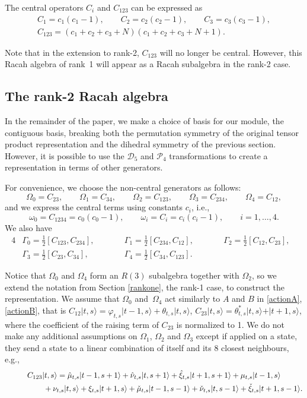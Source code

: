 \documentclass[10pt,a4paper]{amsart}
\numberwithin{equation}{section}
\begin{document}
The central operators $C_i$ and $C_{123}$ can be expressed as
\begin{gather*}
  C_1=c_1(c_1-1),\qquad C_2=c_2(c_2-1),\qquad C_3=c_3(c_3-1),\\
  C_{123}=(c_1+c_2+c_3+N)(c_1+c_2+c_3+N+1).
\end{gather*}


Note that in the extension to rank-2, $C_{123}$ will no longer be central. However, this Racah algebra of rank~1 will appear as a Racah subalgebra in the rank-2 case.

\subsection{The rank-2 Racah algebra}

In the remainder of the paper, we make a choice of basis for our module, the contiguous basis, breaking both the permutation symmetry of the original tensor product representation and the dihedral symmetry of the previous section. However, it is possible to use the $\mathcal{D}_5$ and $\mathcal{P}_4$ transformations to create a representation in terms of other generators.

For convenience, we choose the non-central generators as follows:
\[ \Omega_0 = C_{23}, \qquad \Omega_1=C_{34}, \qquad \Omega_2=C_{123}, \qquad \Omega_3=C_{234}, \qquad \Omega_4=C_{12},\]
and we express the central terms using constants $c_i$, i.e.,
\[
\omega_0=C_{1234}=c_0(c_0-1),\qquad \omega_i=C_i=c_i(c_i-1),\qquad i=1,\dots,4.
\]
We also have
\begin{alignat*}{4}
   &\Gamma_0=\tfrac{1}{2}[C_{123},C_{234}],\qquad && \Gamma_1=\tfrac{1}{2}[C_{234},C_{12}],\qquad &&\Gamma_2=\tfrac{1}{2}[C_{12},C_{23}],&\\
  & \Gamma_3=\tfrac{1}{2}[C_{23},C_{34}],\qquad &&\Gamma_4=\tfrac{1}{2}[C_{34},C_{123}].&&&
\end{alignat*}

Notice that $\Omega_0$ and $\Omega_4$ form an $R(3)$ subalgebra together with $\Omega_2$, so we extend the notation from Section \ref{rankone}, the rank-1 case, to construct the representation. We assume that $\Omega_0$ and~$\Omega_4$ act similarly to $A$ and $B$ in \eqref{actionA}, \eqref{actionB}, that is
$
C_{12}\vert t,s\rangle=\varphi_{t,s}\vert t-1,s\rangle+\theta_{t,s}\vert t,s\rangle$, $ C_{23}\vert t,s\rangle=\theta^*_{t,s}\vert t,s\rangle+\vert t+1,s\rangle$,
where the coefficient of the raising term of $C_{23}$ is normalized to 1. We do not make any additional assumptions on $\Omega_1$, $\Omega_2$ and $\Omega_3$ except if applied on a state, they send a state to a linear combination of itself and its 8 closest neighbours, e.g.,
\begin{gather*}
C_{123}\vert t,s\rangle = \hat{\mu}_{t,s}\vert t-1,s+1\rangle+\hat{\nu}_{t,s}\vert t,s+1\rangle+\hat{\xi}_{t,s}\vert t+1,s+1\rangle+\mu_{t,s}\vert t-1,s\rangle\\
\hphantom{C_{123}\vert t,s\rangle =}{}
+\nu_{t,s}\vert t,s\rangle+\xi_{t,s}\vert t+1,s\rangle+\check{\mu}_{t,s}\vert t-1,s-1\rangle+\check{\nu}_{t,s}\vert t,s-1\rangle+\check{\xi}_{t,s}\vert t+1,s-1\rangle.
\end{gather*}
\end{document}
